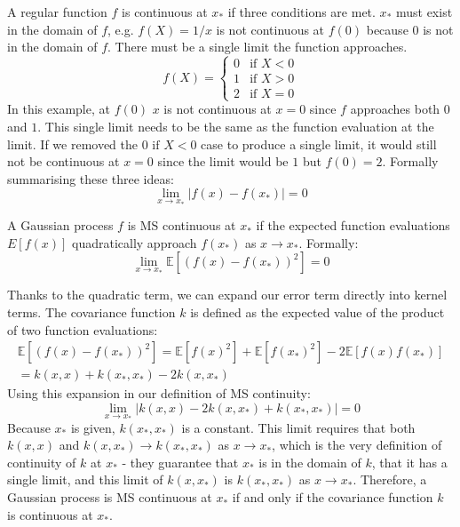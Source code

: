 A regular function $f$ is continuous at $x_*$ if three conditions are met. $x_*$ must exist in the domain of $f$, e.g. $f(X) = 1/x$ is not continuous at $f(0)$ because $0$ is not in the domain of $f$. There must be a single limit the function approaches.
\begin{equation*}
    f(X) = \begin{cases}
        0 & \text{if } X < 0 \\
        1 & \text{if } X > 0 \\
        2 & \text{if } X = 0
    \end{cases}
\end{equation*}
In this example, at $f(0)$ $x$ is not continuous at $x = 0$ since $f$ approaches both $0$ and $1$. This single limit needs to be the same as the function evaluation at the limit. If we removed the $0 \text{ if } X < 0$ case to produce a single limit, it would still not be continuous at $x = 0$ since the limit would be $1$ but $f(0) = 2$. Formally summarising these three ideas:
\begin{equation*}
    \lim_{x \to x_*} |f(x) - f(x_*)| = 0
\end{equation*}

A Gaussian process $f$ is MS continuous at $x_*$ if the expected function evaluations $E[f(x)]$ quadratically approach $f(x_*)$ as $x \to x_*$. \cite{gp-ml} Formally:
\begin{equation*}
    \lim_{x \to x_*} \mathbb{E}[(f(x) - f(x_*))^2] = 0
\end{equation*}

Thanks to the quadratic term, we can expand our error term directly into kernel terms. The covariance function $k$ is defined as the expected value of the product of two function evaluations:
\begin{equation*}
    \begin{aligned}
        \mathbb{E}[(f(x) - f(x_*))^2] = \mathbb{E}[f(x)^2] + \mathbb{E}[f(x_*)^2] - 2\mathbb{E}[f(x)f(x_*)] \\
        = k(x, x) + k(x_*, x_*) - 2k(x, x_*)
    \end{aligned}
\end{equation*}
Using this expansion in our definition of MS continuity: 
\begin{equation} \label{eq:ms_continuity}
    \lim_{x \to x_*} | k(x, x) - 2k(x, x_*) + k(x_*, x_*) | = 0
\end{equation}
Because $x_*$ is given, $k(x_*, x_*)$ is a constant. This limit requires that both $k(x, x)$ and $k(x, x_*) \to k(x_*, x_*)$ as $x \to x_*$, which is the very definition of continuity of $k$ at $x_*$ - they guarantee that $x_*$ is in the domain of $k$, that it has a single limit, and this limit of $k(x, x_*)$ is $k(x_*, x_*)$ as $x \to x_*$. Therefore, a Gaussian process is MS continuous at $x_*$ if and only if the covariance function $k$ is continuous at $x_*$.  


